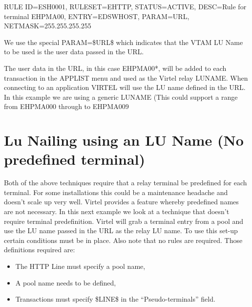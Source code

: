 \documentclass[letterpaper,10pt,english]{sphinxmanual}
\begin{document}
\begin{sphinxVerbatim}[commandchars=\\\{\}]
RULE ID=ESH0001, \PYGZhy{}
RULESET=E\PYGZhy{}HTTP, \PYGZhy{}
STATUS=ACTIVE, \PYGZhy{}
DESC=\PYGZsq{}Rule for terminal EHPMA00\PYGZsq{}, \PYGZhy{}
ENTRY=EDSWHOST, \PYGZhy{}
PARAM=\PYGZdl{}URL\PYGZdl{}, \PYGZhy{}
NETMASK=255.255.255.255
\end{sphinxVerbatim}

We use the special PARAM=\$URL\$ which indicates that the VTAM LU Name to be used is the user data passed in the URL.


The user data in the URL, in this case EHPMA00*, will be added to each transaction in the APPLIST menu and used as the Virtel relay LUNAME. When connecting to an application VIRTEL will use the LU name defined in the URL. In this example we are using a generic LUNAME (This could support a range from EHPMA000 through to EHPMA009

\ignorespaces 

\section{Lu Nailing using an LU Name (No predefined terminal)}
\label{\detokenize{Customization:lu-nailing-using-an-lu-name-no-predefined-terminal}}\label{\detokenize{Customization:index-58}}
Both of the above techniques require that a relay terminal be predefined for each terminal. For some installations this could be a maintenance headache and doesn’t scale up very well. Virtel provides a feature whereby predefined names are not necessary. In this next example we look at a technique that doesn’t require terminal predefinition. Virtel will
grab a terminal entry from a pool and use the LU name passed in the URL as the relay LU name. To use this set-up certain conditions must be in place. Also note that no rules are required. Those definitions required are:
\begin{itemize}
\item {} 
The HTTP Line must specify a pool name,

\item {} 
A pool name needs to be defined,

\item {} 
Transactions must specify \$LINE\$ in the “Pseudo-terminals” field.

\end{itemize}
\end{document}
